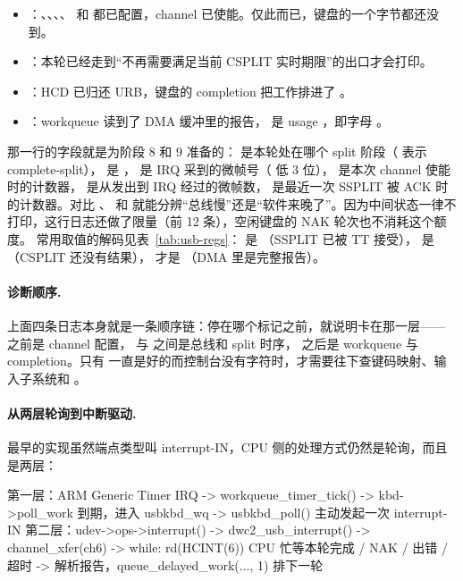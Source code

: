 \begin{itemize}
  \item {}：、、、、 和  都已配置，channel 已使能。仅此而已，键盘的一个字节都还没到。
  \item {}：本轮已经走到“不再需要满足当前 CSPLIT 实时期限”的出口才会打印。
  \item {}：HCD 已归还 URB，键盘的 completion 把工作排进了 。
  \item {}：workqueue 读到了 DMA 缓冲里的报告， 是 usage ，即字母 。
\end{itemize}

 那一行的字段就是为阶段 8 和 9 准备的： 是本轮处在哪个 split 阶段（ 表示 complete-split）， 是 ， 是 IRQ 采到的微帧号（ 低 3 位）， 是本次 channel 使能时的计数器， 是从发出到 IRQ 经过的微帧数， 是最近一次 SSPLIT 被 ACK 时的计数器。对比 、 和  就能分辨“总线慢”还是“软件来晚了”。因为中间状态一律不打印，这行日志还做了限量（前 12 条），空闲键盘的 NAK 轮次也不消耗这个额度。 常用取值的解码见表~\ref{tab:usb-regs}： 是 （SSPLIT 已被 TT 接受）， 是 （CSPLIT 还没有结果）， 才是 （DMA 里是完整报告）。

\paragraph{诊断顺序.} 上面四条日志本身就是一条顺序链：停在哪个标记之前，就说明卡在那一层—— 之前是 channel 配置， 与  之间是总线和 split 时序， 之后是 workqueue 与 completion。只有  一直是好的而控制台没有字符时，才需要往下查键码映射、输入子系统和 。

\paragraph{从两层轮询到中断驱动.} 最早的实现虽然端点类型叫 interrupt-IN，CPU 侧的处理方式仍然是轮询，而且是两层：

\begin{txtcode}
第一层：ARM Generic Timer IRQ
  -> workqueue_timer_tick()
  -> kbd->poll_work 到期，进入 usbkbd_wq
  -> usbkbd_poll() 主动发起一次 interrupt-IN
第二层：udev->ops->interrupt()
  -> dwc2_usb_interrupt() -> channel_xfer(ch6)
  -> while: rd(HCINT(6))          CPU 忙等本轮完成 / NAK / 出错 / 超时
  -> 解析报告，queue_delayed_work(..., 1) 排下一轮
\end{txtcode}

